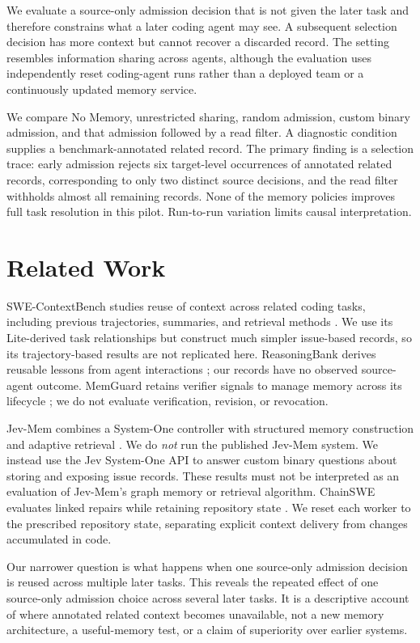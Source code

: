 \documentclass[sigconf,anonymous]{aamas}
\begin{document}
We evaluate a source-only admission decision that is not given the later task and therefore constrains what a later coding agent may see. A subsequent selection decision has more context but cannot recover a discarded record. The setting resembles information sharing across agents, although the evaluation uses independently reset coding-agent runs rather than a deployed team or a continuously updated memory service.

We compare No Memory, unrestricted sharing, random admission, custom binary admission, and that admission followed by a read filter. A diagnostic condition supplies a benchmark-annotated related record. The primary finding is a selection trace: early admission rejects six target-level occurrences of annotated related records, corresponding to only two distinct source decisions, and the read filter withholds almost all remaining records. None of the memory policies improves full task resolution in this pilot. Run-to-run variation limits causal interpretation.

\section{Related Work}
SWE-ContextBench studies reuse of context across related coding tasks, including previous trajectories, summaries, and retrieval methods \cite{zhu2026swecontext}. We use its Lite-derived task relationships but construct much simpler issue-based records, so its trajectory-based results are not replicated here. ReasoningBank derives reusable lessons from agent interactions \cite{ouyang2025reasoningbank}; our records have no observed source-agent outcome. MemGuard retains verifier signals to manage memory across its lifecycle \cite{wang2026memguard}; we do not evaluate verification, revision, or revocation.

Jev-Mem combines a System-One controller with structured memory construction and adaptive retrieval \cite{jiang2026jevmem}. We do \emph{not} run the published Jev-Mem system. We instead use the Jev System-One API to answer custom binary questions about storing and exposing issue records. These results must not be interpreted as an evaluation of Jev-Mem's graph memory or retrieval algorithm. ChainSWE evaluates linked repairs while retaining repository state \cite{jin2026chainswe}. We reset each worker to the prescribed repository state, separating explicit context delivery from changes accumulated in code.

Our narrower question is what happens when one source-only admission decision is reused across multiple later tasks. This reveals the repeated effect of one source-only admission choice across several later tasks. It is a descriptive account of where annotated related context becomes unavailable, not a new memory architecture, a useful-memory test, or a claim of superiority over earlier systems.
\end{document}
